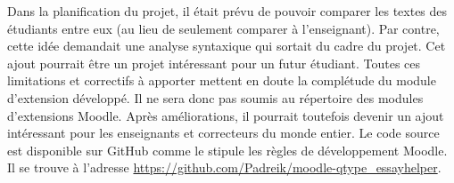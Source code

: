 Dans la planification du projet, il \'etait pr\'evu de pouvoir comparer les textes des \'etudiants entre eux (au lieu de seulement comparer \`a l'enseignant).
Par contre, cette id\'ee demandait une analyse syntaxique qui sortait du cadre du projet.
Cet ajout pourrait \^etre un projet int\'eressant pour un futur \'etudiant.
Toutes ces limitations et correctifs \`a apporter mettent en doute la compl\'etude du module d'extension d\'evelopp\'e.
Il ne sera donc pas soumis au r\'epertoire des modules d'extensions Moodle.
Apr\`es am\'eliorations, il pourrait toutefois devenir un ajout int\'eressant pour les enseignants et correcteurs du monde entier.
Le code source est disponible sur GitHub comme le stipule les r\`egles de d\'eveloppement Moodle.
Il se trouve \`a l'adresse \url{https://github.com/Padreik/moodle-qtype_essayhelper}.